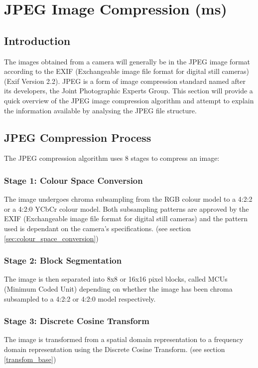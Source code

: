 
\section{JPEG Image Compression (ms)}
\label{jpeg_image_compression}
\subsection{Introduction}
The images obtained from a camera will generally be in the JPEG image format
according to the 
EXIF (Exchangeable image file format for digital still cameras)
 (Exif Version 2.2).\cite{exif_std} 
JPEG is a form of image compression standard named after its developers, 
the Joint Photographic Experts Group. \cite{winzip_jpeg_compression}
This section will provide a quick overview of the JPEG image compression algorithm
and attempt to explain the information available by
analysing the JPEG file structure.

\subsection{JPEG Compression Process}

The JPEG compression algorithm uses 8 
stages to compress an image: \cite{hass_impulse_jpeg}

\subsubsection{Stage 1: Colour Space Conversion}
The image undergoes chroma subsampling from the 
RGB colour model to a 4:2:2 or a 4:2:0 YCbCr colour model. 
Both subsampling patterns are approved by the
EXIF (Exchangeable image file format for digital still cameras)
and the pattern used is dependant on the camera's specifications. 
(see section \ref{sec:colour_space_conversion})

\subsubsection{Stage 2: Block Segmentation}
The image is then separated into 8x8 or 16x16 pixel blocks,
called MCUs (Minimum Coded Unit) 
depending on whether the image has been chroma
subsampled to a 4:2:2 or 4:2:0 model respectively. \cite{exif_std}

\subsubsection{Stage 3: Discrete Cosine Transform}
The image is transformed from a spatial domain 
representation to a frequency domain representation
using the Discrete Cosine Transform. \cite{hass_impulse_jpeg}
(see section \ref{transfom_base})

